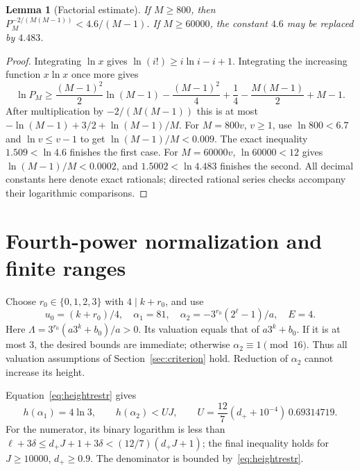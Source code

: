 \documentclass[11pt]{article}
\newtheorem{lemma}[theorem]{Lemma}
\theoremstyle{definition}\newtheorem{definition}[theorem]{Definition}
\begin{document}
\begin{lemma}[Factorial estimate]\label{lem:factorial}
If $M\ge800$, then $P_M^{-2/(M(M-1))}<4.6/(M-1)$. If $M\ge60000$, the constant $4.6$ may be replaced by $4.483$.
\end{lemma}
\begin{proof}
Integrating $\ln x$ gives $\ln(i!)\ge i\ln i-i+1$. Integrating the increasing function $x\ln x$ once more gives
\[
 \ln P_M\ge\frac{(M-1)^2}{2}\ln(M-1)-\frac{(M-1)^2}{4}
 +\frac14-\frac{M(M-1)}2+M-1.
\]
After multiplication by $-2/(M(M-1))$ this is at most
$-\ln(M-1)+3/2+\ln(M-1)/M$.
For $M=800v$, $v\ge1$, use $\ln800<6.7$ and $\ln v\le v-1$ to get $\ln(M-1)/M<0.009$. The exact inequality $1.509<\ln4.6$ finishes the first case. For $M=60000v$, $\ln60000<12$ gives $\ln(M-1)/M<0.0002$, and $1.5002<\ln4.483$ finishes the second. All decimal constants here denote exact rationals; directed rational series checks accompany their logarithmic comparisons.
\end{proof}

\section{Fourth-power normalization and finite ranges}\label{sec:fourth}
Choose $r_0\in\{0,1,2,3\}$ with $4\mid k+r_0$, and use
\[
 u_0=(k+r_0)/4,\quad \alpha_1=81,\quad
 \alpha_2=-3^{r_0}(2^\ell-1)/a,\quad E=4.
\]
Here $\Lambda=3^{r_0}(a3^k+b_0)/a>0$. Its valuation equals that of $a3^k+b_0$. If it is at most $3$, the desired bounds are immediate; otherwise $\alpha_2\equiv1\pmod {16}$. Thus all valuation assumptions of Section~\ref{sec:criterion} hold. Reduction of $\alpha_2$ cannot increase its height.

Equation~\eqref{eq:heightrestr} gives
\[
 h(\alpha_1)=4\ln3,\qquad h(\alpha_2)<UJ,\qquad
 U=\frac{12}{7}(d_++10^{-4})\,0.69314719.
\]
For the numerator, its binary logarithm is less than $\ell+3\delta\le d_+J+1+3\delta<(12/7)(d_+J+1)$; the final inequality holds for $J\ge10000$, $d_+\ge0.9$. The denominator is bounded by~\eqref{eq:heightrestr}.
\end{document}
